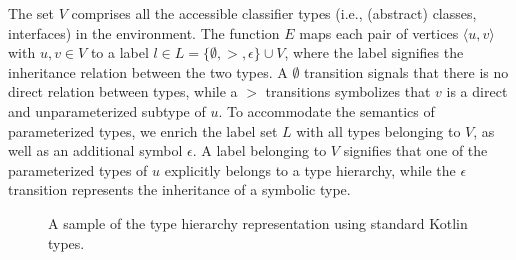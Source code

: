 The set $V$ comprises all the accessible classifier types
(i.e., (abstract) classes, interfaces) in the environment.
The function $E$ maps each pair of vertices $\langle u, v \rangle$ with $u, v \in V$
to a label $l \in L = \{ \emptyset, >, \epsilon \} \cup V$, where the label signifies
the inheritance relation between the two types.
A $\emptyset$ transition signals that there is no direct relation between types, while
a $>$ transitions symbolizes that $v$ is a direct and unparameterized subtype of $u$.
To accommodate the semantics of parameterized types, we enrich the label set $L$
with all types belonging to $V$, as well as an additional symbol $\epsilon$.
A label belonging to $V$ signifies that one of the parameterized types of $u$
explicitly belongs to a type hierarchy, while the $\epsilon$ transition represents
the inheritance of a symbolic type.

\begin{figure}
    \centering
    \caption{A sample of the type hierarchy representation using standard Kotlin types.}
    \label{fig:type-hierarchy}
\end{figure}


